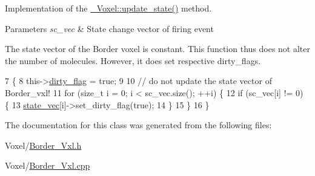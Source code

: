 Implementation of the \hyperlink{classnw_1_1___voxel_a5842ac3c24bda907204852db0cf46810}{\+\_\+\+Voxel\+::update\+\_\+state()} method. 


\begin{DoxyParams}{Parameters}
{\em sc\+\_\+vec} & State change vector of firing event\\
\hline
\end{DoxyParams}
The state vector of the Border voxel is constant. This function thus does not alter the number of molecules. However, it does set respective dirty\+\_\+flags. 
\begin{DoxyCode}
7 \{
8     this->\hyperlink{classnw_1_1___voxel_a9c331fe7c0fd8691ef0124f33809764f}{dirty\_flag} = \textcolor{keyword}{true};
9 
10 \textcolor{comment}{//  do not update the state vector of Border\_vxl!}
11     \textcolor{keywordflow}{for} (\textcolor{keywordtype}{size\_t} i = 0; i < sc\_vec.size(); ++i) \{
12         \textcolor{keywordflow}{if} (sc\_vec[i] != 0) \{
13             \hyperlink{classnw_1_1___voxel_a7762f59802c2a0b54bd18acbf803ff34}{state\_vec}[i]->set\_dirty\_flag(\textcolor{keyword}{true});
14         \}
15     \}
16 \}
\end{DoxyCode}


The documentation for this class was generated from the following files\+:\begin{DoxyCompactItemize}
\item 
Voxel/\hyperlink{_border___vxl_8h}{Border\+\_\+\+Vxl.\+h}\item 
Voxel/\hyperlink{_border___vxl_8cpp}{Border\+\_\+\+Vxl.\+cpp}\end{DoxyCompactItemize}

